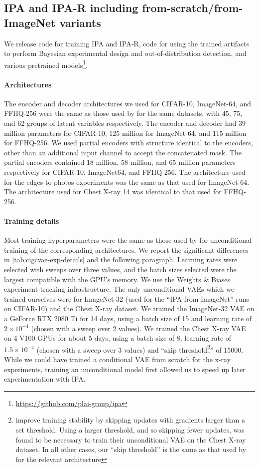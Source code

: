 \subsection{IPA and IPA-R including from-scratch/from-ImageNet variants}
We release code for training IPA and IPA-R, code for using the trained artifacts
to perform Bayesian experimental design and out-of-distribution detection, and
various pretrained models\footnote{\url{https://github.com/plai-group/ipa}}.

\paragraph{Architectures}
The encoder and decoder architectures we used for CIFAR-10, ImageNet-64, and
FFHQ-256 were the same as those used by \citet{child2020very} for the same
datasets, with 45, 75, and 62 groups of latent variables respectively. The
encoder and decoder had 39 million parameters for CIFAR-10, 125 million for
ImageNet-64, and 115 million for FFHQ-256. We used partial encoders with
structure identical to the encoders, other than an additional input channel to
accept the concatenated mask. The partial encoders contained 18 million, 58
million, and 65 million parameters respectively for CIFAR-10, ImageNet64, and
FFHQ-256. The architecture used for the edges-to-photos experiments was the same
as that used for ImageNet-64. The architecture used for Chest X-ray 14 was
identical to that used for FFHQ-256.

\paragraph{Training details}
Most training hyperparameters were the same as those used by
\citet{child2020very} for unconditional training of the corresponding
architectures. We report the significant differences in \cref{tab:cigcvae-exp-details}
and the following paragraph. Learning rates were selected with sweeps over three
values, and the batch sizes selected were the largest compatible with the GPU's
memory. We use the Weights \& Biases~\citep{wandb} experiment-tracking
infrastructure. The only unconditional VAEs which we trained ourselves were for
ImageNet-32 (used for the ``IPA from ImageNet'' runs on CIFAR-10) and the Chest
X-ray dataset. We trained the ImageNet-32 VAE on a GeForce RTX 2080 Ti for 14
days, using a batch size of 15 and learning rate of $2\times10^{-4}$ (chosen
with a sweep over 2 values). We trained the Chest X-ray VAE on 4 V100 GPUs for
about 5 days, using a batch size of 8, learning rate of $1.5\times10^{{-4}}$
(chosen with a sweep over 3 values) and ``skip
threshold\footnote{\citet{child2020very} improve training stability by
  skipping updates with gradients larger than a set threshold. Using a larger
  threshold, and so skipping fewer updates, was found to be necessary to train
  their unconditional VAE on the Chest X-ray dataset. In all other cases, our
  ``skip threshold'' is the same as that used by \citet{child2020very} for the
  relevant architecture}'' of 15000. While we could have trained a conditional VAE
from scratch for the x-ray experiments, training an unconditional model first
allowed us to speed up later experimentation with IPA.

